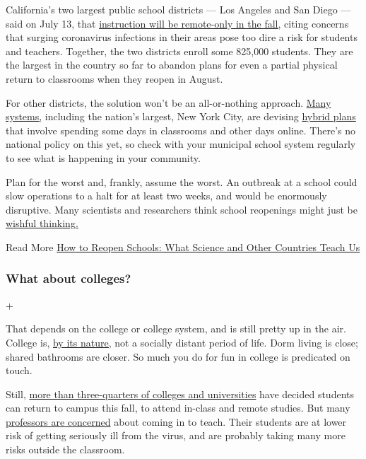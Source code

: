 California's two largest public school districts --- Los Angeles and San
Diego --- said on July 13, that
\href{https://www.nytimes3xbfgragh.onion/2020/07/13/us/lausd-san-diego-school-reopening.html}{instruction
will be remote-only in the fall,} citing concerns that surging
coronavirus infections in their areas pose too dire a risk for students
and teachers. Together, the two districts enroll some 825,000 students.
They are the largest in the country so far to abandon plans for even a
partial physical return to classrooms when they reopen in August.

For other districts, the solution won't be an all-or-nothing approach.
\href{https://bioethics.jhu.edu/research-and-outreach/projects/eschool-initiative/school-policy-tracker/}{Many
systems,} including the nation's largest, New York City, are devising
\href{https://www.nytimes3xbfgragh.onion/2020/06/26/us/coronavirus-schools-reopen-fall.html}{hybrid
plans} that involve spending some days in classrooms and other days
online. There's no national policy on this yet, so check with your
municipal school system regularly to see what is happening in your
community.

Plan for the worst and, frankly, assume the worst. An outbreak at a
school could slow operations to a halt for at least two weeks, and would
be enormously disruptive. Many scientists and researchers think school
reopenings might just be
\href{https://www.nytimes3xbfgragh.onion/2020/06/12/upshot/epidemiologists-decisions-children-school-coronavirus.html}{wishful
thinking.}

Read More
\href{https://www.nytimes3xbfgragh.onion/2020/07/11/health/coronavirus-schools-reopen.html}{How
to Reopen Schools: What Science and Other Countries Teach Us}

\hypertarget{what-about-colleges}{%
\subsubsection{What about colleges?}\label{what-about-colleges}}

+

That depends on the college or college system, and is still pretty up in
the air. College is,
\href{https://www.nytimes3xbfgragh.onion/2020/06/15/opinion/coronavirus-college-safe.html}{by
its nature,} not a socially distant period of life. Dorm living is
close; shared bathrooms are closer. So much you do for fun in college is
predicated on touch.

Still,
\href{https://www.chronicle.com/article/Here-s-a-List-of-Colleges-/248626}{more
than three-quarters of colleges and universities} have decided students
can return to campus this fall, to attend in-class and remote studies.
But many
\href{https://www.nytimes3xbfgragh.onion/2020/07/03/us/coronavirus-college-professors.html}{professors
are concerned} about coming in to teach. Their students are at lower
risk of getting seriously ill from the virus, and are probably taking
many more risks outside the classroom.

